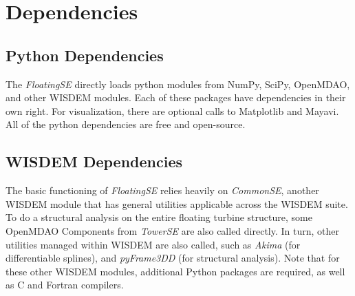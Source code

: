 \section{Dependencies}
\subsection{Python Dependencies}
The \textit{FloatingSE} directly loads python modules from NumPy, SciPy,
OpenMDAO, and other WISDEM modules.  Each of these packages have
dependencies in their own right.  For visualization, there are optional
calls to Matplotlib and Mayavi.  All of the python dependencies are free
and open-source.

\subsection{WISDEM Dependencies}
The basic functioning of \textit{FloatingSE} relies heavily on \textit{CommonSE}, another
WISDEM module that has general utilities applicable across the WISDEM
suite.  To do a structural analysis on the entire floating turbine
structure, some OpenMDAO Components from \textit{TowerSE} are also called
directly.  In turn, other utilities managed within WISDEM are also
called, such as \textit{Akima} (for differentiable splines), and \textit{pyFrame3DD} (for
structural analysis).  Note that for these other WISDEM modules,
additional Python packages are required, as well as C and Fortran compilers.
